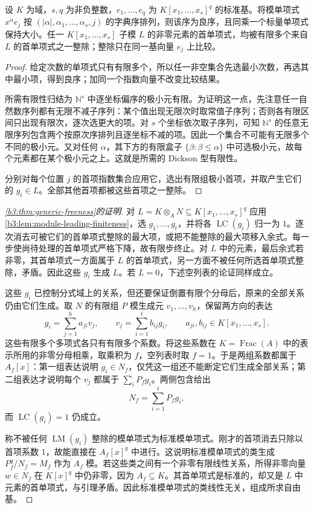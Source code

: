 \begin{lemma}\label{b3:lem:module-leading-finiteness}
	设 \(K\) 为域，\(s,q\) 为非负整数，\(e_1,\ldots,e_q\) 为 \(K[x_1,\ldots,x_s]^q\) 的标准基。将模单项式 \(x^\alpha e_j\) 按 \((|\alpha|,\alpha_1,\ldots,\alpha_s,j)\) 的字典序排列，则该序为良序，且同乘一个标量单项式保持大小。任一 \(K[x_1,\ldots,x_s]\) 子模 \(L\) 的非零元素的首单项式，均被有限多个来自 \(L\) 的首单项式之一整除；整除只在同一基向量 \(e_j\) 上比较。
\end{lemma}
\begin{proof}
	给定次数的单项式只有有限多个，所以任一非空集合先选最小次数，再选其中最小项，得到良序；加同一个指数向量不改变比较结果。

	所需有限性归结为 \(\mathbb N^s\) 中逐坐标偏序的极小元有限。为证明这一点，先注意任一自然数序列都有无限不减子序列：某个值出现无限次时取常值子序列；否则各有限区间只出现有限次，逐次选更大的项。对 \(s\) 个坐标依次取子序列，可知 \(\mathbb N^s\) 的任意无限序列包含两个按原次序排列且逐坐标不减的项。因此一个集合不可能有无限多个不同的极小元。又对任何 \(\alpha\)，其下方的有限盒子 \(\{\beta:\beta\le\alpha\}\) 中可选极小元，故每个元素都在某个极小元之上。这就是所需的 Dickson 型有限性。

	分别对每个位置 \(j\) 的首项指数集合应用它，选出有限组极小首项，并取产生它们的 \(g_i\in L\)。全部其他首项都被这些首项之一整除。
\end{proof}

\begin{proof}[\cref{b3:thm:generic-freeness}的证明]
	对 \(L=K\otimes_A N\subseteq K[x_1,\ldots,x_s]^q\) 应用\cref{b3:lem:module-leading-finiteness}，选 \(g_1,\ldots,g_t\)，并将各 \(\operatorname{LC}(g_i)\) 归一为 \(1\)。逐次消去可被它们的首单项式整除的最大项，或把不能整除的最大项移入余式。每一步使尚待处理的首单项式严格下降，故有限步终止。对 \(L\) 中的元素，最后余式若非零，其首单项式一方面属于 \(L\) 的首单项式，另一方面不被任何所选首单项式整除，矛盾。因此这些 \(g_i\) 生成 \(L\)。若 \(L=0\)，下述空列表的论证同样成立。

	这些 \(g_i\) 已控制分式域上的关系，但还要保证倒置有限个分母后，原来的全部关系仍由它们生成。取 \(N\) 的有限组 \(P\) 模生成元 \(v_1,\ldots,v_h\)，保留两方向的表达
	\[
		g_i=\sum_{j=1}^h a_{ji}v_j,\qquad v_j=\sum_{i=1}^t b_{ij}g_i, \qquad a_{ji},b_{ij}\in K[x_1,\ldots,x_s].
	\]
	这些有限多个多项式各只有有限多个系数。将这些系数在 \(K=\operatorname{Frac}(A)\) 中的表示所用的非零分母相乘，取乘积为 \(f\)，空列表时取 \(f=1\)。于是两组系数都属于 \(A_f[x]\)：第一组表达说明 \(g_i\in N_f\)，仅凭这一组还不能断定它们生成全部关系；第二组表达才说明每个 \(v_j\) 都属于 \(\sum_iP_fg_i\)。两侧包含给出
	\[
		N_f=\sum_{i=1}^tP_fg_i,
	\]
	而 \(\operatorname{LC}(g_i)=1\) 仍成立。

	称不被任何 \(\operatorname{LM}(g_i)\) 整除的模单项式为标准模单项式。刚才的首项消去只除以首项系数 \(1\)，故能直接在 \(A_f[x]^q\) 中进行。这说明标准模单项式的类生成 \(P_f^q/N_f=M_f\) 作为 \(A_f\) 模。若这些类之间有一个非零有限线性关系，所得非零向量 \(w\in N_f\) 在 \(K[x]^q\) 中仍非零，因为 \(A_f\subseteq K\)。其首单项式是标准的，却又是 \(L\) 中元素的首单项式，与引理矛盾。因此标准模单项式的类线性无关，组成所求自由基。
\end{proof}

